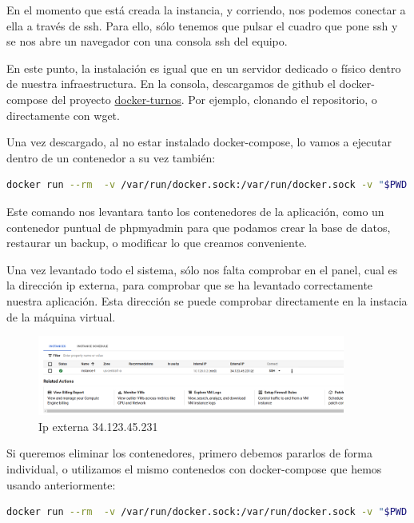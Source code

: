 \documentclass[11pt,spanish,listoffigures,listoftables]{tfgetsinf}
\begin{document}
En el momento que está creada la instancia, y corriendo, nos podemos conectar a ella a través de ssh. Para ello, sólo tenemos que pulsar el cuadro que pone ssh y se nos abre un navegador con una consola ssh del equipo.

En este punto, la instalación es igual que en un servidor dedicado o físico dentro de nuestra infraestructura. En la consola, descargamos de github el docker-compose del proyecto \href{https://github.com/jrinconm/docker-turnos/}{docker-turnos}.
Por ejemplo, clonando el repositorio, o directamente con wget. 

Una vez descargado, al no estar instalado docker-compose, lo vamos a ejecutar dentro de un contenedor a su vez también:

\begin{lstlisting}[language=bash, caption={Comando docker para lanzar docker-compose}]
docker run --rm  -v /var/run/docker.sock:/var/run/docker.sock -v "$PWD:$PWD"   -w="$PWD"  docker/compose:1.24.0 up \d
\end{lstlisting}
Este comando nos levantara tanto los contenedores de la aplicación, como un contenedor puntual de phpmyadmin para que podamos crear la base de datos, restaurar un backup, o modificar lo que creamos conveniente.

Una vez levantado todo el sistema, sólo nos falta comprobar en el panel, cual es la dirección ip externa, para comprobar que se ha levantado correctamente nuestra aplicación. Esta dirección se puede comprobar directamente en la instacia de la máquina virtual.
\begin{figure}[h!] %
  \centering
   \includegraphics[width=0.90\textwidth]{img/ipexterna.png}
   \caption{Ip externa 34.123.45.231}
   \label{fig:ipexterna}
 \end{figure}

Si queremos eliminar los contenedores, primero debemos pararlos de forma individual, o utilizamos el mismo contenedos con docker-compose que hemos usando anteriormente:

\begin{lstlisting}[language=bash, caption={Comando docker para parar docker-compose}]
docker run --rm  -v /var/run/docker.sock:/var/run/docker.sock -v "$PWD:$PWD"   -w="$PWD"  docker/compose:1.24.0 down
\end{lstlisting}
\end{document}

